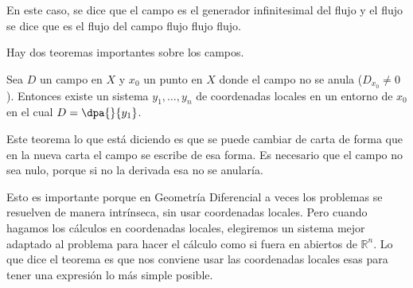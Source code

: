 En este caso, se dice que el campo es el generador infinitesimal del flujo y el flujo se dice que es el flujo del campo flujo flujo flujo.

Hay dos teoremas importantes sobre los campos.

\begin{theorem} Sea $D$ un campo en $X$ y $x_0$ un punto en $X$ donde el campo no se anula ($D_{x_0} ≠ 0$). Entonces existe un sistema $y_1, \dotsc, y_n$ de coordenadas locales en un entorno de $x_0$ en el cual $D = \dpa{}{y_1}$. \label{thmEnderezamientoCampos}
\end{theorem}

Este teorema lo que está diciendo es que se puede cambiar de carta de forma que en la nueva carta el campo se escribe de esa forma. Es necesario que el campo no sea nulo, porque si no la derivada esa no se anularía.

Esto es importante porque en Geometría Diferencial a veces los problemas se resuelven de manera intrínseca, sin usar coordenadas locales. Pero cuando hagamos los cálculos en coordenadas locales, elegiremos un sistema mejor adaptado al problema para hacer el cálculo como si fuera en abiertos de $ℝ^n$. Lo que dice el teorema es que nos conviene usar las coordenadas locales esas para tener una expresión lo más simple posible.

